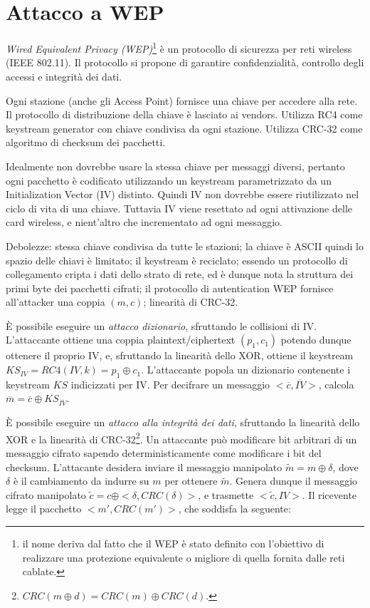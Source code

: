 \section{Attacco a WEP}
\textit{Wired Equivalent Privacy (WEP)}\footnote{il nome deriva dal fatto che il WEP è stato definito con l'obiettivo  di realizzare una protezione equivalente o migliore di quella fornita dalle reti cablate.} è un protocollo di sicurezza per reti wireless (IEEE 802.11). Il protocollo si propone di garantire confidenzialità, controllo degli accessi e integrità dei dati.

Ogni stazione (anche gli Access Point) fornisce una chiave per accedere alla rete. Il protocollo di distribuzione della chiave è lasciato ai vendors.
Utilizza RC4 come keystream generator con chiave condivisa da ogni stazione.
Utilizza CRC-32 come algoritmo di checksum dei pacchetti.

Idealmente non dovrebbe usare la stessa chiave per messaggi diversi, pertanto ogni pacchetto è codificato utilizzando un keystream parametrizzato da un Initialization Vector (IV) distinto. Quindi IV non dovrebbe essere riutilizzato nel ciclo di vita di una chiave. Tuttavia IV viene resettato ad ogni attivazione delle card wireless, e nient'altro che incrementato ad ogni messaggio.

Debolezze: stessa chiave condivisa da tutte le stazioni; la chiave è ASCII quindi lo spazio delle chiavi è limitato; il keystream è reciclato; essendo un protocollo di collegamento cripta i dati dello strato di rete, ed è dunque nota la struttura dei primi byte dei pacchetti cifrati; il protocollo di autentication WEP fornisce all'attacker una coppia $(m,c)$; linearità di CRC-32.

È possibile eseguire un \textit{attacco dizionario}, sfruttando le collisioni di IV.
L'attaccante ottiene una coppia plaintext/ciphertext $(p_{1},c_{1})$ potendo dunque ottenere il proprio IV, e, sfruttando la linearità dello XOR, ottiene il keystream $KS_{IV}=RC4(IV,k)=p_{1} \oplus c_{1}$.
L'attaccante popola un dizionario contenente i keystream $KS$ indicizzati per IV.
Per decifrare un messaggio $<\overline{c},\overline{IV}>$, calcola $\overline{m}=\overline{c} \oplus KS_{\overline{IV}}$.

È possibile eseguire un \textit{attacco alla integrità dei dati}, sfruttando la linearità dello XOR e la linearità di CRC-32\footnote{$CRC(m \oplus d)=CRC(m) \oplus CRC(d)$.}.
Un attaccante può modificare bit arbitrari di un messaggio cifrato sapendo deterministicamente come modificare i bit del checksum.
L'attacante desidera inviare il messaggio manipolato $\tilde{m}=m \oplus \delta$, dove $\delta$ è il cambiamento da indurre su $m$ per ottenere $\tilde{m}$.
Genera dunque il messaggio cifrato manipolato $\tilde{c}=c \oplus <\delta,CRC(\delta)>$, e trasmette $<\tilde{c},IV>$.
Il ricevente legge il pacchetto $<m',CRC(m')>$, che soddisfa la seguente:

